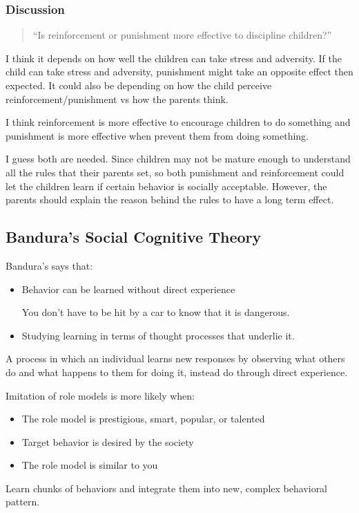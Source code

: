 \documentclass[../main/main.tex]{subfiles}
\begin{document}
\subsubsection{Discussion}
\begin{quote}
  ``Is reinforcement or punishment more effective to discipline children?''
\end{quote}
\begin{example}
I think it depends on how well the children can take stress and adversity. If the child can take stress and adversity, punishment might take an opposite effect then expected. It could also be depending on how the child perceive reinforcement/punishment vs how the parents think.
\end{example}
\begin{example}
I think reinforcement is more effective to encourage children to do something and punishment is more effective when prevent them from doing something.
\end{example}

\begin{example}
I guess both are needed. Since children may not be mature enough to understand all the rules that their parents set, so both punishment and reinforcement could let the children learn if certain behavior is socially acceptable. However, the parents should explain the reason behind the rules to have a long term effect.
\end{example}

\subsection{Bandura's Social Cognitive Theory}
Bandura's  says that:
\begin{itemize}
\item Behavior can be learned without direct experience
        \begin{example}
You don't have to be hit by a car to know that it is dangerous.
        \end{example}
\item Studying learning in terms of thought processes that underlie it.
\end{itemize}
\begin{definition}
  A process in which an individual learns new responses by observing what others do and what happens to them for doing it, instead do through direct experience.
\end{definition}
\begin{remark}
  Imitation of role models is more likely when:
  \begin{itemize}
    \item The role model is prestigious, smart, popular, or talented
    \item Target behavior is desired by the society
          \item The role model is similar to you
  \end{itemize}
\end{remark}
\begin{remark}
Learn chunks of behaviors and integrate them into new, complex behavioral pattern.
\end{remark}
\end{document}
